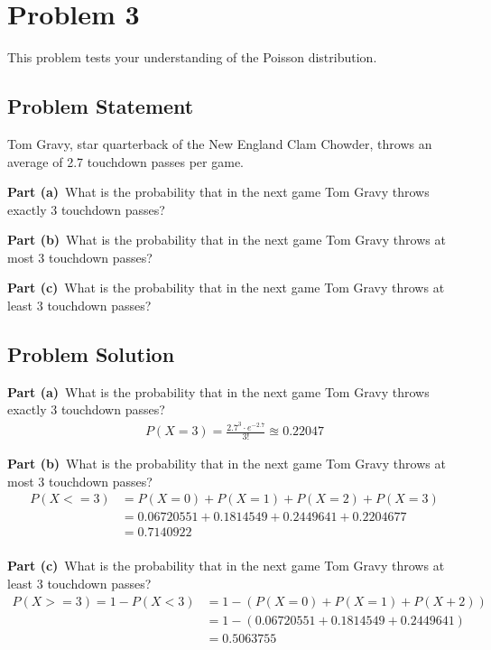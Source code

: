 \documentclass[12pt]{article}
\theoremstyle{definition}
\begin{document}
\newpage
\section*{Problem 3}

This problem tests your understanding of the Poisson distribution.

\subsection*{Problem Statement}

Tom Gravy, star quarterback of the New England Clam Chowder, throws an average of 2.7 touchdown passes per game.

\bigskip
\noindent
{\bf Part (a)}\ What is the probability that in the next game Tom Gravy throws exactly 3 touchdown passes?

\bigskip
\noindent
{\bf Part (b)}\ What is the probability that in the next game Tom Gravy throws at most 3 touchdown passes?

\bigskip
\noindent
{\bf Part (c)}\ What is the probability that in the next game Tom Gravy throws at least 3 touchdown passes?


\subsection*{Problem Solution}

\bigskip
\noindent
{\bf Part (a)}\ What is the probability that in the next game Tom Gravy throws exactly 3 touchdown passes?
\begin{align*}
P(X = 3) = \frac{2.7^3 \cdot e^{-2.7}}{3!} \approxeq 0.22047
\end{align*}

\newpage
\noindent
{\bf Part (b)}\ What is the probability that in the next game Tom Gravy throws at most 3 touchdown passes?
\begin{align*}
P(X <= 3) &= P(X = 0) + P(X = 1) + P(X = 2) + P(X = 3)\\
&= 0.06720551 + 0.1814549 + 0.2449641 + 0.2204677\\
&= 0.7140922\\
\end{align*}

\vspace{4.5in}
\noindent
{\bf Part (c)}\ What is the probability that in the next game Tom Gravy throws at least 3 touchdown passes?
\begin{align*}
P(X >= 3) = 1 - P(X < 3) &= 1 - (P(X = 0) + P(X = 1) + P(X + 2))\\
&= 1 - (0.06720551 + 0.1814549 + 0.2449641)\\
& = 0.5063755\\
\end{align*}
\end{document}
